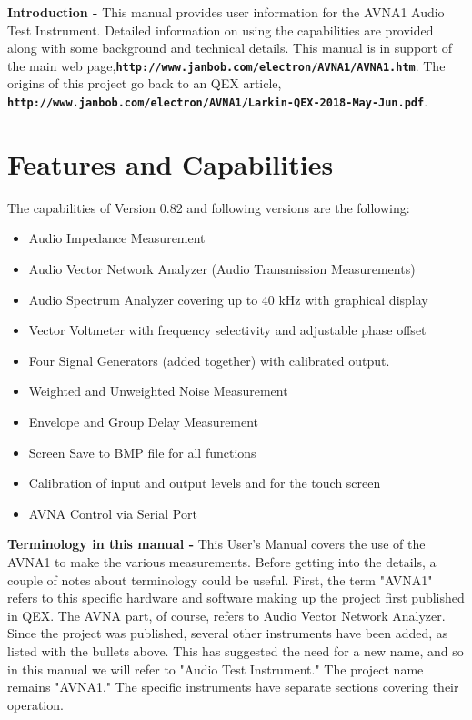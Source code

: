 \pagebreak
\textbf{Introduction - }This manual provides user information for the AVNA1 Audio Test Instrument.  Detailed information on using the capabilities are provided along with some background and technical details.  This manual  is in support of the main web page,\linebreak  \textbf{\texttt{http://www.janbob.com/electron/AVNA1/AVNA1.htm}}.  \linebreak The origins of this project go back to an QEX article, \linebreak \textbf{\texttt{http://www.janbob.com/electron/AVNA1/Larkin-QEX-2018-May-Jun.pdf}}.

\part{Features and Capabilities}
The capabilities of Version 0.82 and following versions are the following: 
\begin{itemize}
\item Audio Impedance Measurement
\item Audio Vector Network Analyzer (Audio Transmission Measurements)
\item Audio Spectrum Analyzer covering up to 40 kHz with graphical display
\item Vector Voltmeter with frequency selectivity and adjustable phase offset
\item Four Signal Generators (added together)  with calibrated output.
\item Weighted and Unweighted Noise Measurement
\item Envelope and Group Delay Measurement
\item Screen Save to BMP file for all functions
\item Calibration of input and output levels and for the touch screen
\item AVNA Control via Serial Port
\end{itemize}

\textbf{Terminology in this manual - }This User's Manual covers the use of the AVNA1 to make the various measurements.  Before getting into the details, a couple of notes about terminology could be useful.  First, the term "AVNA1" refers to this specific hardware and software making up the project first published in QEX.  The AVNA part, of course, refers to Audio Vector Network Analyzer.  Since the project was published, several other instruments have been added, as listed with the bullets above.  This has suggested the need for a new name, and so in this manual we will refer to "Audio Test Instrument."  The project name remains "AVNA1."   The specific instruments have separate sections covering their operation.

